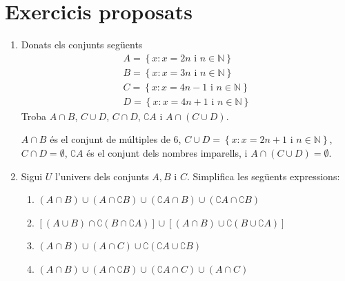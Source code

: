 \chapter{Exercicis proposats}
\label{cap:exercicis}

\begin{enumerate}

\item
\begin{exercici}
Donats els conjunts següents%
\begin{equation*}
\begin{array}{l}
A=\left\{ x:x=2n\text{ \ i \ }n\in \mathbb{N}\right\} \\
B=\left\{ x:x=3n\text{ \ i \ }n\in \mathbb{N}\right\} \\
C=\left\{ x:x=4n-1\text{ \ i \ }n\in \mathbb{N}\right\} \\
D=\left\{ x:x=4n+1\text{ \ i \ }n\in \mathbb{N}\right\}%
\end{array}%
\end{equation*}%
Troba $A\cap B$, $C\cup D$, $C\cap D$, $\complement A$ i $A\cap (C\cup D)$.
\end{exercici}

\begin{indicacio}
$A\cap B$ és el conjunt de múltiples de 6, $C\cup
D=\left\{ x:x=2n+1\text{ \ i \ }n\in \mathbb{N}\right\} $, $C\cap
D=\emptyset $, $\complement A$ és el conjunt dels nombres imparells, i $%
A\cap (C\cup D)=\emptyset $.
\end{indicacio}

\item
\begin{exercici}
Sigui $U$ l'univers dels conjunts $A,B$ i $C$. Simplifica les següents expressions:

\begin{enumerate}
\item[a)] $(A\cap B)\cup (A\cap \complement B)\cup (\complement A\cap B)\cup
(\complement A\cap \complement B)$

\item[b)] $\left[ (A\cup B)\cap \complement \left( B\cap \complement
A\right) \right] \cup \left[ (A\cap B)\cup \complement \left( B\cup
\complement A\right) \right] $

\item[c)] $(A\cap B)\cup (A\cap C)\cup \complement \left( \complement A\cup
\complement B\right) $

\item[d)] $(A\cap B)\cup (A\cap \complement B)\cup (\complement A\cap C)\cup
(A\cap C)$
\end{enumerate}
\end{exercici}


\end{enumerate}
